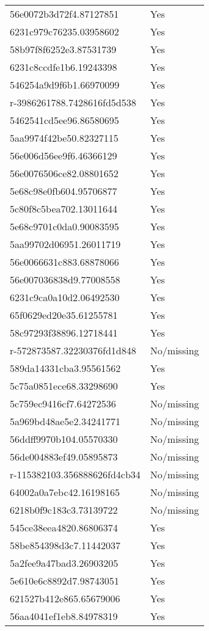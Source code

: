 \begin{tabular}{ll}
56e0072b3d72f4.87127851 & Yes \\
6231c979c76235.03958602 & Yes \\
58b97f8f6252e3.87531739 & Yes \\
6231c8ccdfe1b6.19243398 & Yes \\
546254a9d9f6b1.66970099 & Yes \\
r-3986261788.7428616fd5d538 & Yes \\
5462541cd5ee96.86580695 & Yes \\
5aa9974f42be50.82327115 & Yes \\
56e006d56ee9f6.46366129 & Yes \\
56e0076506ce82.08801652 & Yes \\
5e68c98e0fb604.95706877 & Yes \\
5c80f8c5bea702.13011644 & Yes \\
5e68c9701c0da0.90083595 & Yes \\
5aa99702d06951.26011719 & Yes \\
56e0066631c883.68878066 & Yes \\
56e007036838d9.77008558 & Yes \\
6231c9ca0a10d2.06492530 & Yes \\
65f0629ed20e35.61255781 & Yes \\
58c97293f38896.12718441 & Yes \\
r-572873587.32230376fd1d848 & No/missing \\
589da14331cba3.95561562 & Yes \\
5c75a0851ece68.33298690 & Yes \\
5c759ec9416cf7.64272536 & No/missing \\
5a969bd48ae5e2.34241771 & No/missing \\
56ddff9970b104.05570330 & No/missing \\
56de004883ef49.05895873 & No/missing \\
r-115382103.356888626fd4cb34 & No/missing \\
64002a0a7ebc42.16198165 & No/missing \\
6218b0f9c183c3.73139722 & No/missing \\
545ce38eea4820.86806374 & Yes \\
58be854398d3c7.11442037 & Yes \\
5a2fee9a47bad3.26903205 & Yes \\
5e610e6c8892d7.98743051 & Yes \\
621527b412e865.65679006 & Yes \\
56aa4041ef1eb8.84978319 & Yes \\

\end{tabular}
